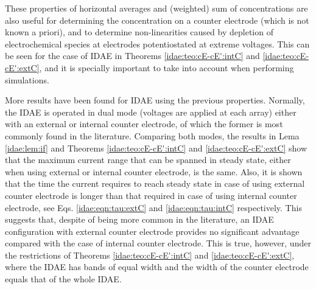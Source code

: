 These properties of horizontal averages and (weighted) sum of concentrations
are also useful for determining the concentration on a counter electrode
(which is not known a priori), and to determine non-linearities
caused by depletion of electrochemical species
at electrodes potentiostated at extreme voltages.
This can be seen for the case of IDAE
in Theorems \ref{idae:teo:cE-cE':intC} and \ref{idae:teo:cE-cE':extC},
and it is specially important to take into account when performing simulations.

More results have been found for IDAE using the previous properties.
Normally, the IDAE is operated in dual mode (voltages are applied at each array)
either with an external or internal counter electrode,
of which the former is most commonly found in the literature.
Comparing both modes, the results
in Lema \ref{idae:lem:if} and Theorems \ref{idae:teo:cE-cE':intC} and \ref{idae:teo:cE-cE':extC}
show that the maximum current range that can be spanned in steady state,
either when using external or internal counter electrode, is the same.
Also, it is shown that the time the current requires to reach steady state
in case of using external counter electrode is longer
than that required in case of using internal counter electrode,
see Eqs. \eqref{idae:eqn:tau:extC} and \eqref{idae:eqn:tau:intC} respectively.
This suggests that, despite of being more common in the literature,
an IDAE configuration with external counter electrode provides
no significant advantage compared with the case of internal counter electrode.
This is true, however, under the restrictions
of Theorems \ref{idae:teo:cE-cE':intC} and \ref{idae:teo:cE-cE':extC},
where the IDAE has bands of equal width
and the width of the counter electrode equals that of the whole IDAE.
